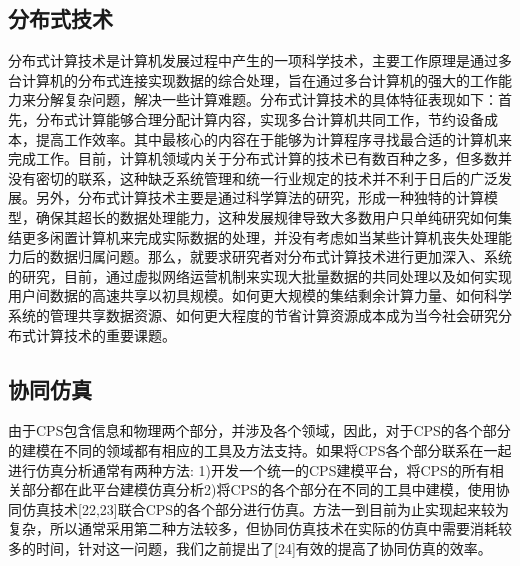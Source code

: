 \subsection{分布式技术}
分布式计算技术是计算机发展过程中产生的一项科学技术，主要工作原理是通过多台计算机的分布式连接实现数据的综合处理，旨在通过多台计算机的强大的工作能力来分解复杂问题，解决一些计算难题。分布式计算技术的具体特征表现如下：首先，分布式计算能够合理分配计算内容，实现多台计算机共同工作，节约设备成本，提高工作效率。其中最核心的内容在于能够为计算程序寻找最合适的计算机来完成工作。目前，计算机领域内关于分布式计算的技术已有数百种之多，但多数并没有密切的联系，这种缺乏系统管理和统一行业规定的技术并不利于日后的广泛发展。另外，分布式计算技术主要是通过科学算法的研究，形成一种独特的计算模型，确保其超长的数据处理能力，这种发展规律导致大多数用户只单纯研究如何集结更多闲置计算机来完成实际数据的处理，并没有考虑如当某些计算机丧失处理能力后的数据归属问题。那么，就要求研究者对分布式计算技术进行更加深入、系统的研究，目前，通过虚拟网络运营机制来实现大批量数据的共同处理以及如何实现用户间数据的高速共享以初具规模。如何更大规模的集结剩余计算力量、如何科学系统的管理共享数据资源、如何更大程度的节省计算资源成本成为当今社会研究分布式计算技术的重要课题。

\subsection{协同仿真}
由于CPS包含信息和物理两个部分，并涉及各个领域，因此，对于CPS的各个部分的建模在不同的领域都有相应的工具及方法支持。如果将CPS各个部分联系在一起进行仿真分析通常有两种方法: 1)开发一个统一的CPS建模平台，将CPS的所有相关部分都在此平台建模仿真分析2)将CPS的各个部分在不同的工具中建模，使用协同仿真技术[22,23]联合CPS的各个部分进行仿真。方法一到目前为止实现起来较为复杂，所以通常采用第二种方法较多，但协同仿真技术在实际的仿真中需要消耗较多的时间，针对这一问题，我们之前提出了[24]有效的提高了协同仿真的效率。


